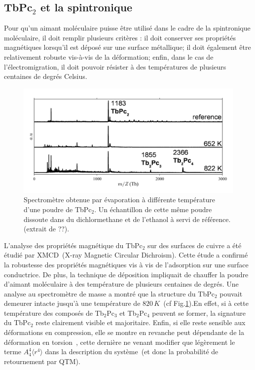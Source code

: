 \subsection{TbPc$_2$ et la spintronique}
Pour qu'un aimant moléculaire puisse être utilisé dans le cadre de la spintronique moléculaire, il doit remplir plusieurs critères : il doit conserver ses propriétés magnétiques lorsqu'il est déposé sur une surface métallique; il doit également être relativement robuste vis-à-vis de la déformation; enfin, dans le cas de l'électromigration, il doit pouvoir résister à des températures de plusieurs centaines de degrés Celsius.

\begin{figure}
\centering \includegraphics[scale=0.45]{Resultats/TbPcResTemp/TbPcResTemp.pdf} 
\caption{Spectromètre obtenue par évaporation à différente température d'une poudre de TbPc$_2$. Un échantillon de cette même poudre dissoute dans du dichlormethane et de l'ethanol à servi de référence. (extrait de ??).}
\label{SpectMass}
\end{figure}

L'analyse des propriétés magnétique du TbPc$_{2}$ sur des surfaces de cuivre a été étudié par XMCD~(X-ray Magnetic Circular Dichroism). Cette étude a confirmé la robustesse des propriétés magnétiques vis à vis de l'adsorption sur une surface conductrice. De plus, la technique de déposition impliquait de chauffer la poudre d'aimant moléculaire à des température de plusieurs centaines de degrés. Une analyse au spectromètre de masse a montré que la structure du TbPc$_{2}$ pouvait demeurer intacte jusqu'à une température de $820\,K$~(cf Fig.\ref{SpectMass}).En effet, si à cette température des composés de Tb$_2$Pc$_3$ et Tb$_2$Pc$_4$ peuvent se former, la signature du TbPc$_2$ reste clairement visible et majoritaire. Enfin, si elle reste sensible aux déformations en compression, elle se montre en revanche peut dépendante de la déformation en torsion~\cite{Sorace2011}, cette dernière ne venant modifier que légèrement le terme $A_4^4 \langle r^4 \rangle$ dans la description du système~(et donc la probabilité de retournement par QTM).

